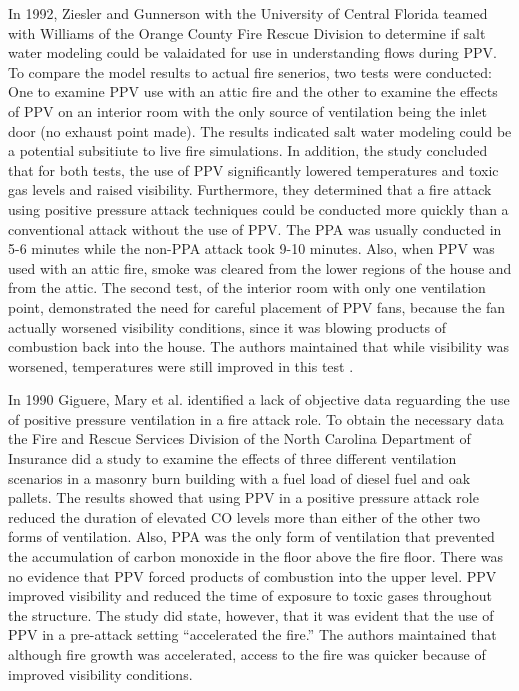 \documentclass{article}
\begin{document}
In 1992, Ziesler and Gunnerson with the University of Central Florida teamed with Williams of the Orange County Fire Rescue Division to determine if salt water modeling could be valaidated for use in understanding flows during PPV. To compare the model results to actual fire senerios, two tests were conducted: One to examine PPV use with an attic fire and the other to examine the effects of PPV on an interior room with the only source of ventilation being the inlet door (no exhaust point made). The results indicated salt water modeling could be a potential subsitiute to live fire simulations. In addition, the study concluded that for both tests, the use of PPV significantly lowered temperatures and toxic gas levels and raised visibility. Furthermore, they determined that a fire attack using positive pressure attack techniques could be conducted more quickly than a conventional attack without the use of PPV. The PPA was usually conducted in 5-6 minutes while the non-PPA attack took 9-10 minutes. Also, when PPV was used with an attic fire, smoke was cleared from the lower regions of the house and from the attic. The second test, of the interior room with only one ventilation point, demonstrated the need for careful placement of PPV fans, because the fan actually worsened visibility conditions, since it was blowing products of combustion back into the house. The authors maintained that while visibility was worsened, temperatures were still improved in this test \cite{AdvancesinPPV}.

In 1990 Giguere, Mary et al. identified a lack of objective data reguarding the use of positive pressure ventilation in a fire attack role. To obtain the necessary data the Fire and Rescue Services Division of the North Carolina Department of Insurance did a study to examine the effects of three different ventilation scenarios in a masonry burn building with a fuel load of diesel fuel and oak pallets. The results showed that using PPV in a positive pressure attack role reduced the duration of elevated CO levels more than either of the other two forms of ventilation. Also, PPA was the only form of ventilation that prevented the accumulation of carbon monoxide in the floor above the fire floor. There was no evidence that PPV forced products of combustion into the upper level. PPV improved visibility and reduced the time of exposure to toxic gases throughout the structure. The study did state, however, that it was evident that the use of PPV in a pre-attack setting “accelerated the fire.” The authors maintained that although fire growth was accelerated, access to the fire was quicker because of improved visibility conditions.\cite{GiguereToxicGas}
\end{document}

